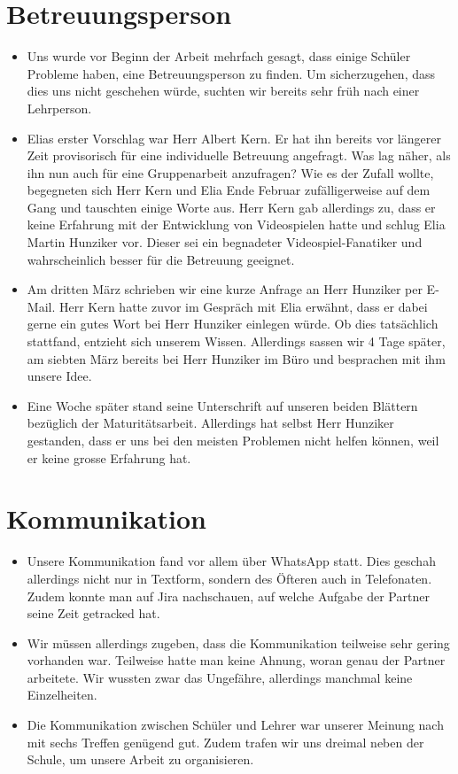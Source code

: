 \section{Betreuungsperson}
\begin{itemize}
    \item Uns wurde vor Beginn der Arbeit mehrfach gesagt, dass einige Schüler Probleme haben, eine Betreuungsperson zu finden. Um sicherzugehen, dass dies uns nicht geschehen würde, suchten wir bereits sehr früh nach einer Lehrperson.
    \item Elias erster Vorschlag war Herr Albert Kern. Er hat ihn bereits vor längerer Zeit provisorisch für eine individuelle Betreuung angefragt. Was lag näher, als ihn nun auch für eine Gruppenarbeit anzufragen? Wie es der Zufall wollte, begegneten sich 
    Herr Kern und Elia Ende Februar zufälligerweise auf dem Gang und tauschten einige Worte aus. Herr Kern gab allerdings zu, dass er keine Erfahrung mit der Entwicklung von Videospielen hatte und schlug Elia Martin Hunziker vor.
    Dieser sei ein begnadeter Videospiel-Fanatiker und wahrscheinlich besser für die Betreuung geeignet. 
    \item Am dritten März schrieben wir eine kurze Anfrage an Herr Hunziker per E-Mail. Herr Kern hatte zuvor im Gespräch mit Elia erwähnt, dass er dabei gerne ein gutes Wort bei Herr Hunziker einlegen würde. Ob dies tatsächlich 
    stattfand, entzieht sich unserem Wissen. Allerdings sassen wir 4 Tage später, am siebten März bereits bei Herr Hunziker im Büro und besprachen mit ihm unsere Idee. 
    \item Eine Woche später stand seine Unterschrift auf unseren beiden Blättern bezüglich der Maturitätsarbeit. Allerdings hat selbst Herr Hunziker gestanden, dass er uns bei den meisten Problemen nicht helfen können, weil er
    keine grosse Erfahrung hat.
\end{itemize}

\section{Kommunikation}
\begin{itemize}
    \item Unsere Kommunikation fand vor allem über WhatsApp statt. Dies geschah allerdings nicht nur in Textform, sondern des Öfteren auch in Telefonaten. Zudem konnte man auf Jira nachschauen, auf welche Aufgabe der Partner
    seine Zeit getracked hat. 
    \item Wir müssen allerdings zugeben, dass die Kommunikation teilweise sehr gering vorhanden war. Teilweise hatte man keine Ahnung, woran genau der Partner arbeitete. Wir wussten zwar das Ungefähre, allerdings manchmal keine Einzelheiten.
    \item Die Kommunikation zwischen Schüler und Lehrer war unserer Meinung nach mit sechs Treffen genügend gut. Zudem trafen wir uns dreimal neben der Schule, um unsere Arbeit zu organisieren.
\end{itemize}



